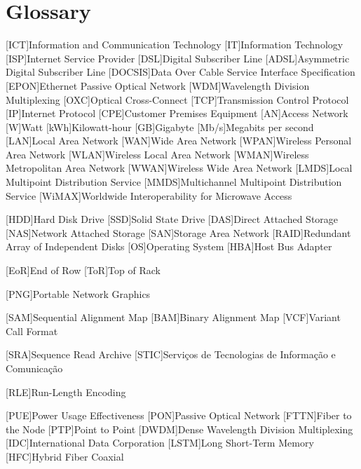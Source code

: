 \chapter{Glossary}

\footnotesize
\SingleSpacing

\begin{multicols}{2}
\begin{acronym}[AAAAAA]


	[ICT]{Information and Communication Technology}
	[IT]{Information Technology}
	[ISP]{Internet Service Provider}
	[DSL]{Digital Subscriber Line}
	[ADSL]{Asymmetric Digital Subscriber Line}
	[DOCSIS]{Data Over Cable Service Interface Specification}
	[EPON]{Ethernet Passive Optical Network}
	[WDM]{Wavelength Division Multiplexing}
	[OXC]{Optical Cross-Connect}
	[TCP]{Transmission Control Protocol}
	[IP]{Internet Protocol}
	[CPE]{Customer Premises Equipment}
	[AN]{Access Network}
	{Watt}
	[kWh]{Kilowatt-hour}
	[GB]{Gigabyte}
	[Mb/s]{Megabits per second}
	[LAN]{Local Area Network}
	[WAN]{Wide Area Network}
	[WPAN]{Wireless Personal Area Network}
	[WLAN]{Wireless Local Area Network}
	[WMAN]{Wireless Metropolitan Area Network}
	[WWAN]{Wireless Wide Area Network}
	[LMDS]{Local Multipoint Distribution Service}
	[MMDS]{Multichannel Multipoint Distribution Service}
	[WiMAX]{Worldwide Interoperability for Microwave Access}

	[HDD]{Hard Disk Drive}
	[SSD]{Solid State Drive}
	[DAS]{Direct Attached Storage}
	[NAS]{Network Attached Storage}
	[SAN]{Storage Area Network}
	[RAID]{Redundant Array of Independent Disks}
	[OS]{Operating System}
	[HBA]{Host Bus Adapter}

	[EoR]{End of Row}
	[ToR]{Top of Rack}

	[PNG]{Portable Network Graphics}

	[SAM]{Sequential Alignment Map}
	[BAM]{Binary Alignment Map}
	[VCF]{Variant Call Format}

	[SRA]{Sequence Read Archive}
	[STIC]{Serviços de Tecnologias de Informação e Comunicação}

	[RLE]{Run-Length Encoding}

	[PUE]{Power Usage Effectiveness}
	[PON]{Passive Optical Network}
	[FTTN]{Fiber to the Node}
	[PTP]{Point to Point}
	[DWDM]{Dense Wavelength Division Multiplexing}
	[IDC]{International Data Corporation}
	[LSTM]{Long Short-Term Memory}
	[HFC]{Hybrid Fiber Coaxial}

\end{acronym}
\end{multicols}

